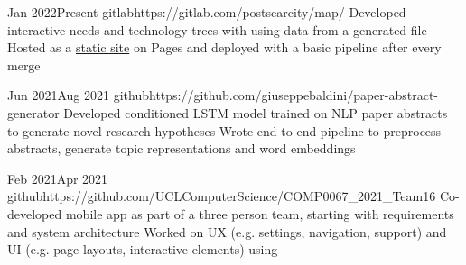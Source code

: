 

       {Jan 2022}{Present}
{gitlab}{https://gitlab.com/postscarcity/map/}
{Developed interactive needs and technology trees with  using data from a generated  file}
{Hosted as a \href{https://postscarcitymap.org/}{static site} on  Pages and deployed with a basic  pipeline after every  merge}


      {Jun 2021}{Aug 2021}
{github}{https://github.com/giuseppebaldini/paper-abstract-generator}
{Developed conditioned LSTM model trained on NLP paper abstracts to generate novel research hypotheses}
{Wrote end-to-end pipeline to preprocess abstracts, generate topic representations and word embeddings}


              {Feb 2021}{Apr 2021}
{github}{https://github.com/UCLComputerScience/COMP0067_2021_Team16}
{Co-developed mobile app as part of a three person team, starting with requirements and system architecture}
{Worked on UX (e.g. settings, navigation, support) and UI (e.g. page layouts, interactive elements) using }
